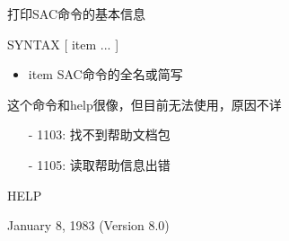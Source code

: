 \label{cmd:syntax}

打印SAC命令的基本信息

SYNTAX [ item ... ]

\begin{itemize}
\item item SAC命令的全名或简写
\end{itemize}

这个命令和help很像，但目前无法使用，原因不详

\begin{itemize}
\item[-]1103: 找不到帮助文档包
\item[-]1105: 读取帮助信息出错
\end{itemize}

HELP

January 8, 1983 (Version 8.0)
